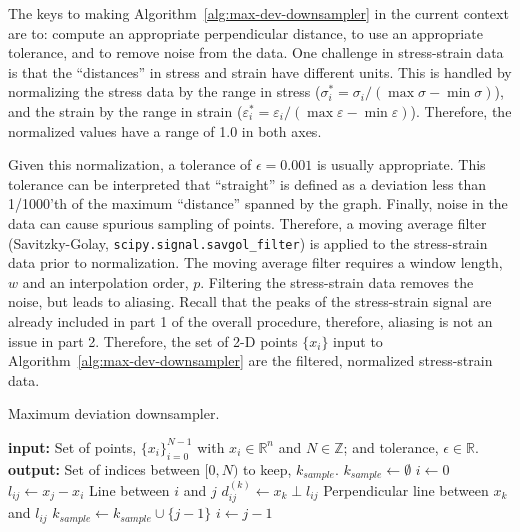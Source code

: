 \documentclass[a4paper,11pt]{article}
\begin{document}
The keys to making Algorithm~\ref{alg:max-dev-downsampler} in the current context are to: compute an appropriate perpendicular distance, to use an appropriate tolerance, and to remove noise from the data.
One challenge in stress-strain data is that the ``distances'' in stress and strain have different units.
This is handled by normalizing the stress data by the range in stress ($\sigma_i^* = \sigma_i / (\max \sigma - \min \sigma)$), and the strain by the range in strain ($\varepsilon_i^* = \varepsilon_i / (\max \varepsilon - \min \varepsilon)$).
Therefore, the normalized values have a range of 1.0 in both axes.

Given this normalization, a tolerance of $\epsilon = 0.001$ is usually appropriate.
This tolerance can be interpreted that ``straight'' is defined as a deviation less than 1/1000'th of the maximum ``distance'' spanned by the graph.
Finally, noise in the data can cause spurious sampling of points.
Therefore, a moving average filter (Savitzky-Golay, \texttt{scipy.signal.savgol\_filter}) is applied to the stress-strain data prior to normalization.
The moving average filter requires a window length, $w$ and an interpolation order, $p$.
Filtering the stress-strain data removes the noise, but leads to aliasing.
Recall that the peaks of the stress-strain signal are already included in part 1 of the overall procedure, therefore, aliasing is not an issue in part 2.
Therefore, the set of 2-D points $\{x_i\}$ input to Algorithm~\ref{alg:max-dev-downsampler} are the filtered, normalized stress-strain data.

\begin{algorithm}
	\caption{Maximum deviation downsampler.}
	\label{alg:max-dev-downsampler}
	\begin{algorithmic}[1]
		\State \textbf{input:} Set of points, $\{x_i\}_{i=0}^{N-1}$ with $x_i \in \mathbb{R}^n$ and $N \in \mathbb{Z}$; and tolerance, $\epsilon \in \mathbb{R}$.
        \State \textbf{output:} Set of indices between $[0, N)$ to keep, $k_{sample}$.
        \State $k_{sample} \gets \emptyset$
        \State $i \gets 0$
			\State $l_{ij} \gets x_j - x_i$
            \Comment Line between $i$ and $j$
                \State $d^{(k)}_{ij} \gets x_k \perp l_{ij}$
                \Comment Perpendicular line between $x_k$ and $l_{ij}$
            \EndFor
                \State $k_{sample} \gets k_{sample} \cup \{j - 1 \}$
                \State $i \gets j - 1$
            \EndIf
		\EndFor
\end{algorithmic}
\end{algorithm}
\end{document}
